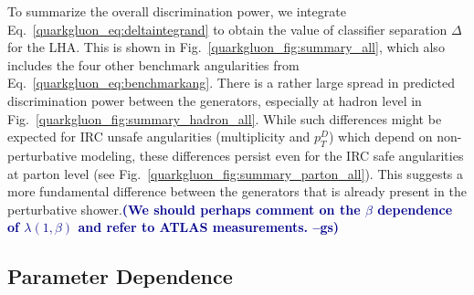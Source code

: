 \documentclass[11pt]{cernrep}
\newcommand{\gs}[1]{\textbf{\textcolor{darkblue}{(#1 --gs)}}}
\begin{document}
To summarize the overall discrimination power, we integrate
Eq.~\eqref{quarkgluon_eq:deltaintegrand} to obtain the value of
classifier separation $\Delta$ for the LHA.  This is shown in
Fig.~\ref{quarkgluon_fig:summary_all}, which also includes the four
other benchmark angularities from
Eq.~\eqref{quarkgluon_eq:benchmarkang}.  There is a rather large
spread in predicted discrimination power between the generators,
especially at hadron level in
Fig.~\ref{quarkgluon_fig:summary_hadron_all}.  While such differences
might be expected for IRC unsafe angularities (multiplicity and
$p_T^D$) which depend on non-perturbative modeling, these differences
persist even for the IRC safe angularities at parton level (see
Fig.~\ref{quarkgluon_fig:summary_parton_all}).  This suggests a more
fundamental difference between the generators that is already present
in the perturbative shower.\gs{We should perhaps comment on the
  $\beta$ dependence of $\lambda(1,\beta)$ and refer to ATLAS
  measurements.}

\subsection{Parameter Dependence}
\label{quarkgluon_sec:ee_scales}
\end{document}
